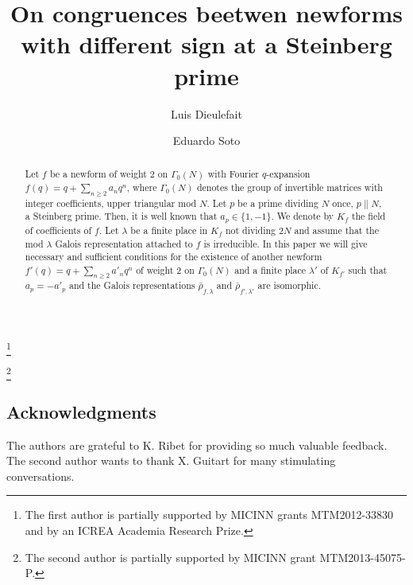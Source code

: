 \documentclass[12pt,reqno]{amsart}
\theoremstyle{plain}
\theoremstyle{definition}
\begin{document}
\title{On congruences beetwen newforms with different sign at a Steinberg prime}

\author{Luis Dieulefait}
\thanks{The first author is partially supported by MICINN grants MTM2012-33830 and by an ICREA Academia
Research Prize.}
 \author{Eduardo Soto}
\thanks{The second author is partially supported by MICINN grant MTM2013-45075-P.}

\address{L. Dieulefait\\ Departament d'Àlgebra i Geometria\\ Universitat de Barcelona\\ Barcelona, Spain}

\address{E. Soto\\
Departament d'Àlgebra i Geometria\\ Universitat de Barcelona\\ Barcelona, Spain} 

\maketitle

\begin{abstract}
Let $f$ be a newform of weight $2$ on $\Gamma_0(N)$ with Fourier $q$-expansion $f(q)=q+\sum_{n\geq 2} a_n q^n$, where $\Gamma_0(N)$ denotes the group of invertible matrices with integer coefficients, upper triangular mod $N$. Let $p$ be a prime dividing $N$ once, $p\parallel N$, a Steinberg prime. Then, it is well known that $a_p\in\{1,-1\}$. We denote by $K_f$ the field of coefficients of $f$. Let $\lambda$ be a finite place in $K_f$ not dividing $2N$ and assume that the mod $\lambda$ Galois representation attached to $f$ is irreducible. In this paper we will give necessary and sufficient conditions for the existence of another newform $f'(q)=q+\sum_{n\geq 2} a'_n q^n$ of weight $2$ on $\Gamma_0(N)$ and a finite place $\lambda'$ of $K_{f'}$ such that $a_p=-a'_p$ and the Galois representations $\bar\rho_{f,\lambda}$ and $\bar\rho_{f',\lambda'}$ are isomorphic.
\end{abstract}
\subsection*{Acknowledgments}
The authors are grateful to K. Ribet for providing so much valuable feedback. The second author wants to thank X. Guitart for many stimulating conversations. 
\end{document}
